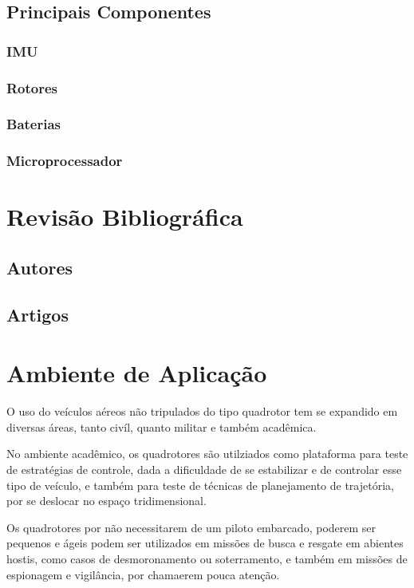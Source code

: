 \subsection{Principais Componentes}

\subsubsection{IMU}

\subsubsection{Rotores}

\subsubsection{Baterias}

\subsubsection{Microprocessador}

\section{Revisão Bibliográfica}
\subsection{Autores}
\subsection{Artigos}

\section{Ambiente de Aplicação}
O uso do veículos aéreos não tripulados do tipo quadrotor tem se expandido em diversas áreas, tanto civíl, quanto militar e também acadêmica.

No ambiente acadêmico, os quadrotores são utilziados como plataforma para teste de estratégias de controle, dada a dificuldade de se estabilizar e de controlar esse tipo de veículo, e também para teste de técnicas de planejamento de trajetória, por se deslocar no espaço tridimensional.

Os quadrotores por não necessitarem de um piloto embarcado, poderem ser pequenos e ágeis podem ser utilizados em missões de busca e resgate em abientes hostis, como casos de desmoronamento ou soterramento, e também em missões de espionagem e vigilância, por chamaerem pouca atenção.

